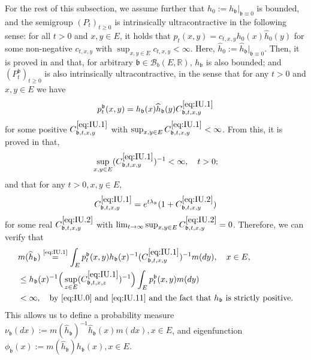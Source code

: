 \documentclass[12pt,a4paper]{amsart}
\numberwithin{equation}{section}
\theoremstyle{plain}
\theoremstyle{definition}
\theoremstyle{remark}
\newcounter{N}
\newcounter{n}[N]
\begin{document}
For the rest of this subsection, we assume further that $h_0:= h_\mathfrak b|_{\mathfrak{b} \equiv 0}$ is bounded, and the semigroup $(P_t)_{t\geq 0}$ is intrinsically ultracontractive in the following sense: for all $t>0$ and $x, y \in E$, it holds that $p_t(x,y) = c_{t,x,y} h_0(x) \widehat h_0(y)$ for some non-negative $c_{t,x,y}$ with $\sup_{x,y \in E} c_{t,x,y}< \infty$.
Here, $\widehat h_0 := \widehat h_\mathfrak b|_{\mathfrak{b}\equiv 0}$.
Then, it is proved in \cite{RenSongZhang2015Limit} and \cite{RenSongZhang2017Central} that, for arbitrary $\mathfrak b \in \mathcal B_b(E,\mathbb R)$, $h_\mathfrak b$ is also bounded; and $(P_t^\mathfrak b)_{t\geq 0}$ is also intrinsically ultracontractive, in the sense that for any $t> 0$ and $x,y \in E$ we have \begin{equation}
\label{eq:IU.1} p^\mathfrak b_t(x,y) = h_\mathfrak b(x) \widehat h_\mathfrak b (y) C^{\eqref{eq:IU.1}}_{\mathfrak b,t,x,y}
\end{equation}
for some positive $C^{\eqref{eq:IU.1}}_{\mathfrak b,t,x,y}$ with $\sup_{x,y \in E} C^{\eqref{eq:IU.1}}_{\mathfrak b,t,x,y}< \infty$.
From this, it is proved in \cite{KimSong2008Intrinsic} that,
\begin{equation}
\label{eq:IU.11}\sup_{x,y \in E} (C^{\eqref{eq:IU.1}}_{\mathfrak b,t,x,y})^{-1}< \infty, \quad t>0;
\end{equation}
and that for any $t>0, x,y \in E$,
\begin{equation}\label{eq:IU.2}  C^{\eqref{eq:IU.1}}_{\mathfrak b,t,x,y} = e^{t\lambda_\mathfrak{b}} (1+ C^{\eqref{eq:IU.2}}_{\mathfrak b,t,x,y})\end{equation}
for some real $C^{\eqref{eq:IU.2}}_{\mathfrak b,t,x,y}$ with $\lim_{t\to \infty} \sup_{x,y \in E} C^{\eqref{eq:IU.2}}_{\mathfrak b,t,x,y} =0$.
Therefore, we can verify that
\begin{align}
& m(\widehat h_{\mathfrak b}) \overset{\text{\eqref{eq:IU.1}}}= \int_{E} p_t^\mathfrak{b}(x,y)h_\mathfrak{b}(x)^{-1} (C^{\eqref{eq:IU.1}}_{\mathfrak b,t,x,y})^{-1} m(dy), \quad x\in E,
\\&\leq  h_\mathfrak{b}(x)^{-1} \Big(\sup_{z\in E}(C^{\eqref{eq:IU.1}}_{\mathfrak b,t,x,z})^{-1}\Big)  \int_{E} p_t^\mathfrak{b}(x,y)m(dy)
\\& < \infty,\quad\text{by \eqref{eq:IU.0} and \eqref{eq:IU.11} and the fact that $h_\mathfrak{b}$ is strictly positive}.
\end{align}
This allows us to define a probability measure $\nu_\mathfrak b (dx):= m(\widehat h_{\mathfrak b})^{-1} \widehat h_\mathfrak b (x)m(dx), x\in E$, and eigenfunction
$\phi_\mathfrak{b}(x) := m(\widehat h_{\mathfrak b}) h_\mathfrak b(x), x\in E$.
\end{document}
